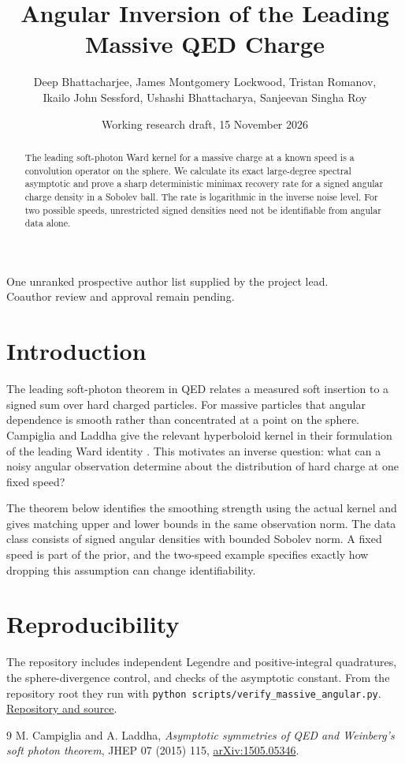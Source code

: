 \documentclass[11pt]{article}
\title{Angular Inversion of the Leading Massive QED Charge}
\author{\normalsize Deep Bhattacharjee, James Montgomery Lockwood, Tristan Romanov,\\
\normalsize Ikailo John Sessford, Ushashi Bhattacharya, Sanjeevan Singha Roy}
\date{Working research draft, 15 November 2026}
\begin{document}
\maketitle
\begin{center}\small\color{teal!70!black}
One unranked prospective author list supplied by the project lead.\\
Coauthor review and approval remain pending.
\end{center}
\begin{abstract}
The leading soft-photon Ward kernel for a massive charge at a known
speed is a convolution operator on the sphere. We calculate its exact
large-degree spectral asymptotic and prove a sharp deterministic
minimax recovery rate for a signed angular charge density in a
Sobolev ball. The rate is logarithmic in the inverse noise level. For
two possible speeds, unrestricted signed densities need not be
identifiable from angular data alone.
\end{abstract}

\section{Introduction}
The leading soft-photon theorem in QED relates a measured soft
insertion to a signed sum over hard charged particles. For massive
particles that angular dependence is smooth rather than concentrated
at a point on the sphere. Campiglia and Laddha give the relevant
hyperboloid kernel in their formulation of the leading Ward identity
\cite{massive-qed}. This motivates an inverse question: what can a
noisy angular observation determine about the distribution of hard
charge at one fixed speed?

The theorem below identifies the smoothing strength using the actual
kernel and gives matching upper and lower bounds in the same
observation norm. The data class consists of signed angular densities
with bounded Sobolev norm. A fixed speed is part of the prior, and
the two-speed example specifies exactly how dropping this assumption
can change identifiability.



\section*{Reproducibility}
The repository includes independent Legendre and positive-integral
quadratures, the sphere-divergence control, and checks of the
asymptotic constant. From the repository root they run with
\texttt{python scripts/verify\_massive\_angular.py}.
\href{https://github.com/anaxia-research/celestial-infrared-stability}{Repository and source}.

\begin{thebibliography}{9}
 M. Campiglia and A. Laddha,
\emph{Asymptotic symmetries of QED and Weinberg's soft photon theorem},
JHEP 07 (2015) 115,
\href{https://arxiv.org/abs/1505.05346}{arXiv:1505.05346}.
\end{thebibliography}
\end{document}
